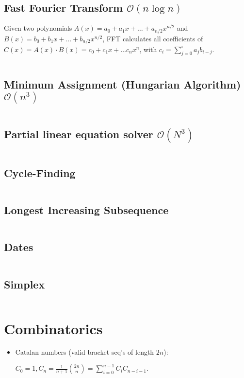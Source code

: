 \documentclass[9pt,a4paper,landscape,oneside]{amsart}
\newcommand{\mintedstyle}[2]{\inputminted{#1}{code/#2}}
\newcommand{\code}[1]{\mintedstyle{cpp}{#1}}
\newenvironment{myitemize}
{\begin{itemize}[leftmargin=.3cm]
	\setlength{\itemsep}{0pt}
	\setlength{\parskip}{0pt}
	\setlength{\parsep}{0pt}     }
{ \end{itemize}                  }
\begin{document}
\begin{multicols*}{3}
\subsection{Fast Fourier Transform $\mathcal{O}(n \log n)$}
Given two polynomials $A(x) = a_0 + a_1 x + \dots + a_{n/2} x^{n/2}$ and $B(x) = b_0 + b_1 x + \dots + b_{n/2} x^{n/2}$, FFT calculates all coefficients of $C(x) = A(x) \cdot B(x) = c_0 + c_1 x + \dots c_{n} x^{n}$, with $c_i = \sum_{j=0}^{i} a_j b_{i-j}$.
\code{math/fft.cpp}

\subsection{Minimum Assignment (Hungarian Algorithm) $\mathcal{O}(n^{3})$}
\code{minimum_assignment.cpp}

\subsection{Partial linear equation solver $\mathcal{O}(N^3)$}
\code{matrix_solver.cpp}

\subsection{Cycle-Finding}
\code{other/floyds_algorithm.cpp}

\subsection{Longest Increasing Subsequence}
\code{other/lis.cpp}

\subsection{Dates}
\code{other/dates.cpp}

\subsection{Simplex}
\code{other/simplex.cpp}


\section{Combinatorics}
\begin{myitemize}
	\item Catalan numbers (valid bracket seq's of length $2n$):

		$C_0 = 1, C_n = \frac{1}{n+1}\binom{2n}{n} = \sum_{i=0}^{n-1}C_iC_{n-i-1}$.


\end{myitemize}
\end{multicols*}
\end{document}
